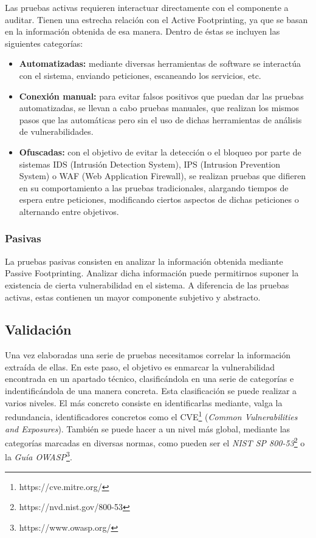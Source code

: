 Las pruebas activas requieren interactuar directamente con el componente a auditar. Tienen una estrecha relación con el Active Footprinting, ya que se basan en la información obtenida de esa manera. Dentro de éstas se incluyen las siguientes categorías:

\begin{itemize}
	\item \textbf{Automatizadas:} mediante diversas herramientas de software se interactúa con el sistema, enviando peticiones, escaneando los servicios, etc.
	\item \textbf{Conexión manual:} para evitar falsos positivos que puedan dar las pruebas automatizadas, se llevan a cabo pruebas manuales, que realizan los mismos pasos que las automáticas pero sin el uso de dichas herramientas de análisis de vulnerabilidades.
	\item \textbf{Ofuscadas:} con el objetivo de evitar la detección o el bloqueo por parte de sistemas IDS (Intrusión Detection System), IPS (Intrusion Prevention System) o WAF (Web Application Firewall), se realizan pruebas que difieren en su comportamiento a las pruebas tradicionales, alargando tiempos de espera entre peticiones, modificando ciertos aspectos de dichas peticiones o alternando entre objetivos.
\end{itemize}

\subsubsection{Pasivas}

La pruebas pasivas consisten en analizar la información obtenida mediante Passive Footprinting. Analizar dicha información puede permitirnos suponer la existencia de cierta vulnerabilidad en el sistema. A diferencia de las pruebas activas, estas contienen un mayor componente subjetivo y abstracto.

\subsection{Validación}

Una vez elaboradas una serie de pruebas necesitamos correlar la información extraída de ellas. En este paso, el objetivo es enmarcar la vulnerabilidad encontrada en un apartado técnico, clasificándola en una serie de categorías e indentificándola de una manera concreta. Esta clasificación se puede realizar a varios niveles.
El más concreto consiste en identificarlas mediante, valga la redundancia, identificadores concretos como el CVE\footnote{https://cve.mitre.org/} (\textit{Common Vulnerabilities and Exposures}). También se puede hacer a un nivel más global, mediante las categorías marcadas en diversas normas, como pueden ser el \emph{NIST SP 800-53}\footnote{https://nvd.nist.gov/800-53} o la \textit{Guía OWASP}\footnote{https://www.owasp.org/}.
	
